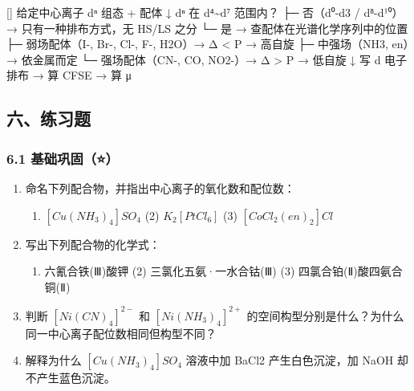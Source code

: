 \documentclass[a4paper,11pt]{ctexart}
\providecommand{\tightlist}{\setlength{\itemsep}{0pt}\setlength{\parskip}{0pt}}
\newenvironment{Shaded}{}{}
\newenvironment{Highlighting}{}{}
\newcommand{\NormalTok}[1]{#1}
\begin{document}
\begin{Shaded}
\begin{Highlighting}[]
\NormalTok{给定中心离子 dⁿ 组态 + 配体}
\NormalTok{    ↓}
\NormalTok{dⁿ 在 d⁴\textasciitilde{}d⁷ 范围内？}
\NormalTok{├─ 否（d⁰{-}d3 / d⁸{-}d¹⁰）→ 只有一种排布方式，无 HS/LS 之分}
\NormalTok{└─ 是 → 查配体在光谱化学序列中的位置}
\NormalTok{    ├─ 弱场配体（I{-}, Br{-}, Cl{-}, F{-}, H2O）→ Δ \textless{} P → 高自旋}
\NormalTok{    ├─ 中强场（NH3, en）→ 依金属而定}
\NormalTok{    └─ 强场配体（CN{-}, CO, NO2{-}）→ Δ \textgreater{} P → 低自旋}
\NormalTok{        ↓}
\NormalTok{写 d 电子排布 → 算 CFSE → 算 μ}
\end{Highlighting}
\end{Shaded}

\subsection{六、练习题}\label{ux516dux7ec3ux4e60ux9898}

\subsubsection{6.1 基础巩固（⭐）}\label{ux57faux7840ux5de9ux56fa}

\begin{enumerate}
\def\labelenumi{\arabic{enumi}.}
\item
  命名下列配合物，并指出中心离子的氧化数和配位数：

  \begin{enumerate}
  \def\labelenumii{(\arabic{enumii})}
  \tightlist
  \item
    \([Cu(NH_3)_4]SO_4\) (2) \(K_2[PtCl_6]\) (3) \([CoCl_2(en)_2]Cl\)
  \end{enumerate}
\item
  写出下列配合物的化学式：

  \begin{enumerate}
  \def\labelenumii{(\arabic{enumii})}
  \tightlist
  \item
    六氰合铁(Ⅲ)酸钾 (2) 三氯化五氨·一水合钴(Ⅲ) (3) 四氯合铂(Ⅱ)酸四氨合铜(Ⅱ)
  \end{enumerate}
\item
  判断 \([Ni(CN)_4]^{2-}\) 和 \([Ni(NH_3)_4]^{2+}\) 的空间构型分别是什么？为什么同一中心离子配位数相同但构型不同？
\item
  解释为什么 \([Cu(NH_3)_4]SO_4\) 溶液中加 BaCl2 产生白色沉淀，加 NaOH 却不产生蓝色沉淀。
\end{enumerate}
\end{document}
